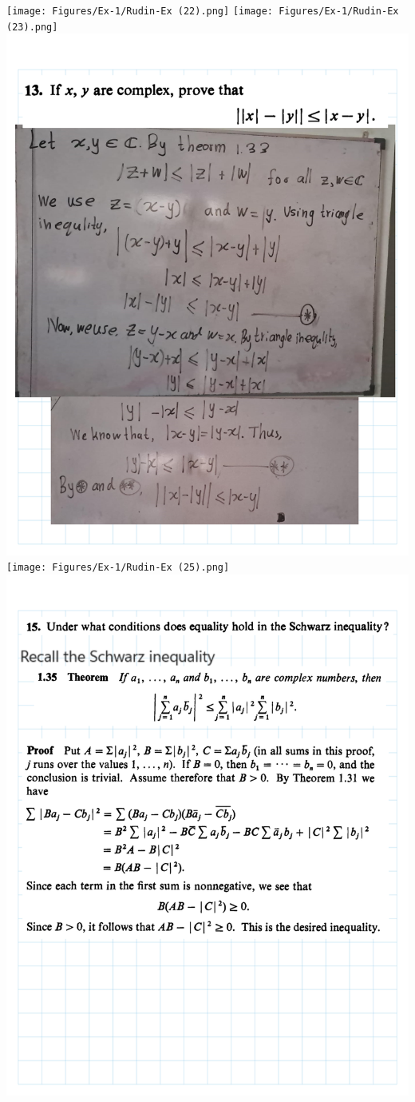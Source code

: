 \documentclass[
]{book}
\theoremstyle{definition}
\theoremstyle{definition}
\theoremstyle{definition}
\theoremstyle{definition}
\theoremstyle{remark}
\begin{document}
\texttt{[image: Figures/Ex-1/Rudin-Ex (22).png]}
\texttt{[image: Figures/Ex-1/Rudin-Ex (23).png]}
\includegraphics{Figures/Ex-1/Rudin-Ex (24).png}
\texttt{[image: Figures/Ex-1/Rudin-Ex (25).png]}
\includegraphics{Figures/Ex-1/Rudin-Ex (26).png}
\end{document}
